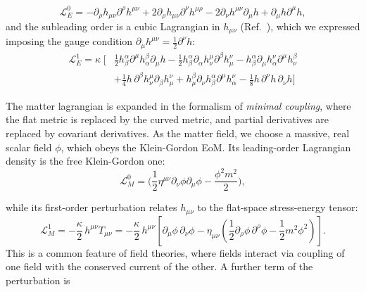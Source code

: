 \documentclass[12pt,a4paper,oneside]{article}
\numberwithin{equation}{section}   %
\begin{document}
\begin{equation}\label{PF}
\boxed{
\mathcal{L}^0_E =
-\partial_\rho h_{\mu\nu}\partial^\rho h^{\mu\nu}
+2\partial_\rho h_{\mu\nu}\partial^\nu h^{\mu\rho}
-2\partial_\nu h^{\mu\nu}\partial_\mu h
+\partial_\mu h\partial^\mu h,}
\end{equation}
and the subleading
 order is a cubic Lagrangian in $h_{\mu\nu}$
(Ref.~\cite{ChoiShimSong1995}), 
which we expressed imposing the gauge condition
$\partial_\mu h^{\mu\nu} = \frac{1}{2} \partial^\nu h$:
\begin{equation}\label{TH}
\boxed{
\begin{aligned}
\mathcal{L}_E^{1}={} \kappa \;\Big[ &
\frac{1}{2} h_\beta^\alpha \partial^\mu h_\alpha^\beta \partial_\mu h
- \frac{1}{2} h_\beta^\alpha \partial_\alpha h_\nu^\mu \partial^\beta h_\mu^\nu
- h_\beta^\alpha \partial_\mu h_\alpha^\nu \partial^\mu h_\nu^\beta\\
&+ \frac{1}{4} h\, \partial^\beta h_\nu^\mu \partial_\beta h_\mu^\nu
+ h_\mu^\beta \partial_\nu h_\beta^\alpha \partial^\mu h_\alpha^\nu
- \frac{1}{8} h\, \partial^\nu h\, \partial_\nu h  \Big]
\end{aligned}}
\end{equation}

The matter lagrangian is expanded in the formalism
of \textit{minimal coupling}, where the flat metric is replaced
by the curved metric, and partial derivatives are replaced by covariant derivatives.
As the matter field, we choose a massive, real scalar field $\phi$, which
obeys the Klein-Gordon EoM. 
Its leading-order Lagrangian density is the free Klein-Gordon one:
\begin{equation}
\boxed{\mathcal{L}_M^{0}
= \Big(\frac{1}{2}\eta^{\mu\nu}\partial_\nu \phi \partial_\mu \phi - \frac{\phi^2m^2}{2}\Big),}
\end{equation}


 while its first-order perturbation relates $h_{\mu\nu}$ to the flat-space stress-energy tensor:
\begin{equation}
\boxed{
\mathcal{L}_M^{1} = -\frac{\kappa}{2} \, h^{\mu\nu}T_{\mu\nu}
=
-\frac{\kappa}{2} \, h^{\mu\nu}
\left[
\partial_\mu \phi\, \partial_\nu \phi
- \eta_{\mu\nu}\left(\frac12 \partial_\rho \phi\, \partial^\rho \phi - \frac12 m^2 \phi^2\right)
\right].
}
\end{equation}
This is a common feature of field theories, where fields interact
via coupling of one field with the conserved current of the other. 
A further term of the perturbation is
  
\end{document}
